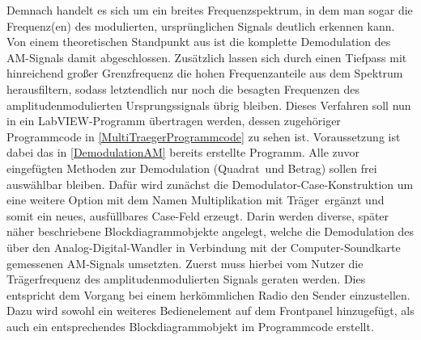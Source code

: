 \documentclass[
a4paper,
12pt,
pagesize,
ngerman
]{scrartcl}
\begin{document}
	\noindent Demnach handelt es sich um ein breites Frequenzspektrum, in dem man sogar die Frequenz(en) des modulierten, ursprünglichen Signals deutlich erkennen kann. %
	Von einem theoretischen Standpunkt aus ist die komplette Demodulation des AM-Signals damit abgeschlossen. %
	Zusätzlich lassen sich durch einen Tiefpass mit hinreichend großer Grenzfrequenz die hohen Frequenzanteile aus dem Spektrum herausfiltern, sodass letztendlich nur noch die besagten Frequenzen des amplitudenmodulierten Ursprungssignals übrig bleiben. 
	Dieses Verfahren soll nun in ein LabVIEW-Programm übertragen werden, dessen zugehöriger Programmcode in \ref{MultiTraegerProgrammcode} zu sehen ist. 
	Voraussetzung ist dabei das in \cref{DemodulationAM} bereits erstellte Programm.
	Alle zuvor eingefügten Methoden zur Demodulation (\glqq Quadrat\grqq\ und \glqq Betrag\grqq ) sollen frei auswählbar bleiben.
	Dafür wird zunächst die Demodulator-Case-Konstruktion um eine weitere Option mit dem Namen \glqq Multiplikation mit Träger\grqq\ ergänzt und somit ein neues, ausfüllbares Case-Feld erzeugt.
	Darin werden diverse, später näher beschriebene Blockdiagrammobjekte angelegt, welche die Demodulation des über den Analog-Digital-Wandler in Verbindung mit der Computer-Soundkarte gemessenen AM-Signals umsetzten.
	Zuerst muss hierbei vom Nutzer die Trägerfrequenz des amplitudenmodulierten Signals geraten werden.
	Dies entspricht dem Vorgang bei einem herkömmlichen Radio den Sender einzustellen. %
	Dazu wird sowohl ein weiteres Bedienelement auf dem Frontpanel hinzugefügt, als auch ein entsprechendes Blockdiagrammobjekt im Programmcode erstellt.
	
\end{document}
